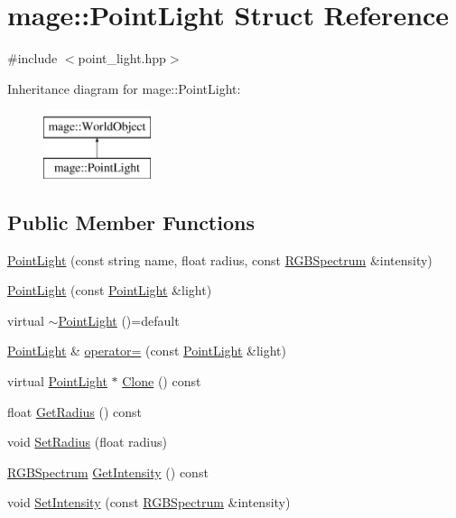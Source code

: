 \hypertarget{structmage_1_1_point_light}{}\section{mage\+:\+:Point\+Light Struct Reference}
\label{structmage_1_1_point_light}


{\ttfamily \#include $<$point\+\_\+light.\+hpp$>$}

Inheritance diagram for mage\+:\+:Point\+Light\+:\begin{figure}[H]
\begin{center}
\leavevmode
\includegraphics[height=2.000000cm]{structmage_1_1_point_light}
\end{center}
\end{figure}
\subsection*{Public Member Functions}
\begin{DoxyCompactItemize}
\item 
\hyperlink{structmage_1_1_point_light_ac9d479055720799816d0489669cbd986}{Point\+Light} (const string name, float radius, const \hyperlink{structmage_1_1_r_g_b_spectrum}{R\+G\+B\+Spectrum} \&intensity)
\item 
\hyperlink{structmage_1_1_point_light_a0b0d5b110f1af47091ae682db7320c62}{Point\+Light} (const \hyperlink{structmage_1_1_point_light}{Point\+Light} \&light)
\item 
virtual \hyperlink{structmage_1_1_point_light_ae76fc13ca85717694d55d1a3bb195a98}{$\sim$\+Point\+Light} ()=default
\item 
\hyperlink{structmage_1_1_point_light}{Point\+Light} \& \hyperlink{structmage_1_1_point_light_ae194c7b6e032ddbbf110009348b08c33}{operator=} (const \hyperlink{structmage_1_1_point_light}{Point\+Light} \&light)
\item 
virtual \hyperlink{structmage_1_1_point_light}{Point\+Light} $\ast$ \hyperlink{structmage_1_1_point_light_a5a685d110af3ec491105147a15df7b87}{Clone} () const
\item 
float \hyperlink{structmage_1_1_point_light_a6321441e96d79caaacf40056beb288f2}{Get\+Radius} () const
\item 
void \hyperlink{structmage_1_1_point_light_ae7b4c301c148bd78348e26e5b6ad8faf}{Set\+Radius} (float radius)
\item 
\hyperlink{structmage_1_1_r_g_b_spectrum}{R\+G\+B\+Spectrum} \hyperlink{structmage_1_1_point_light_aee79741f59d9abebfdd77784c4b29381}{Get\+Intensity} () const
\item 
void \hyperlink{structmage_1_1_point_light_a40c0790159f687fd653a4792f8b39a21}{Set\+Intensity} (const \hyperlink{structmage_1_1_r_g_b_spectrum}{R\+G\+B\+Spectrum} \&intensity)
\end{DoxyCompactItemize}
